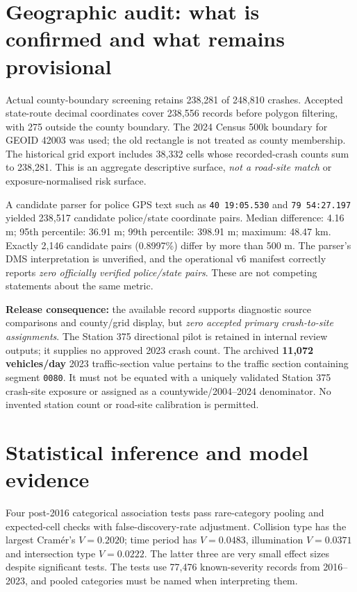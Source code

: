 \documentclass[11pt,a4paper,openany]{report}
\newcommand{\pathcode}[1]{\nolinkurl{#1}}
\begin{document}
\section{Geographic audit: what is confirmed and what remains provisional}
Actual county-boundary screening retains 238,281 of 248,810 crashes. Accepted state-route decimal coordinates cover 238,556 records before polygon filtering, with 275 outside the county boundary. The 2024 Census 500k boundary for GEOID 42003 was used; the old rectangle is not treated as county membership. The historical grid export includes 38,332 cells whose recorded-crash counts sum to 238,281. This is an aggregate descriptive surface, \emph{not a road-site match} or exposure-normalised risk surface.

A candidate parser for police GPS text such as \pathcode{40 19:05.530} and \pathcode{79 54:27.197} yielded 238,517 candidate police/state coordinate pairs. Median difference: 4.16 m; 95th percentile: 36.91 m; 99th percentile: 398.91 m; maximum: 48.47 km. Exactly 2,146 candidate pairs (0.8997\%) differ by more than 500 m. The parser's DMS interpretation is unverified, and the operational v6 manifest correctly reports \emph{zero officially verified police/state pairs}. These are not competing statements about the same metric.

\textbf{Release consequence:} the available record supports diagnostic source comparisons and county/grid display, but \emph{zero accepted primary crash-to-site assignments}. The Station 375 directional pilot is retained in internal review outputs; it supplies no approved 2023 crash count. The archived \textbf{11,072 vehicles/day} 2023 traffic-section value pertains to the traffic section containing segment \pathcode{0080}. It must not be equated with a uniquely validated Station 375 crash-site exposure or assigned as a countywide/2004--2024 denominator. No invented station count or road-site calibration is permitted.

\section{Statistical inference and model evidence}
Four post-2016 categorical association tests pass rare-category pooling and expected-cell checks with false-discovery-rate adjustment. Collision type has the largest Cram\'er's $V=0.2020$; time period has $V=0.0483$, illumination $V=0.0371$ and intersection type $V=0.0222$. The latter three are very small effect sizes despite significant tests. The tests use 77,476 known-severity records from 2016--2023, and pooled categories must be named when interpreting them.
\end{document}

